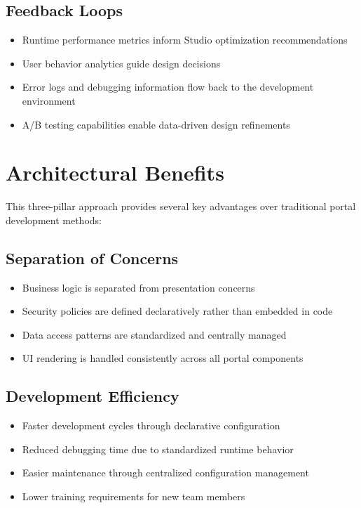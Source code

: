 \subsection{Feedback Loops}

\begin{itemize}
	\item Runtime performance metrics inform Studio optimization recommendations
	\item User behavior analytics guide design decisions
	\item Error logs and debugging information flow back to the development environment
	\item A/B testing capabilities enable data-driven design refinements
\end{itemize}

\section{Architectural Benefits}
\label{sec:architectural-benefits}

This three-pillar approach provides several key advantages over traditional portal development methods:

\subsection{Separation of Concerns}

\begin{itemize}
	\item Business logic is separated from presentation concerns
	\item Security policies are defined declaratively rather than embedded in code
	\item Data access patterns are standardized and centrally managed
	\item UI rendering is handled consistently across all portal components
\end{itemize}

\subsection{Development Efficiency}

\begin{itemize}
	\item Faster development cycles through declarative configuration
	\item Reduced debugging time due to standardized runtime behavior
	\item Easier maintenance through centralized configuration management
	\item Lower training requirements for new team members
\end{itemize}


